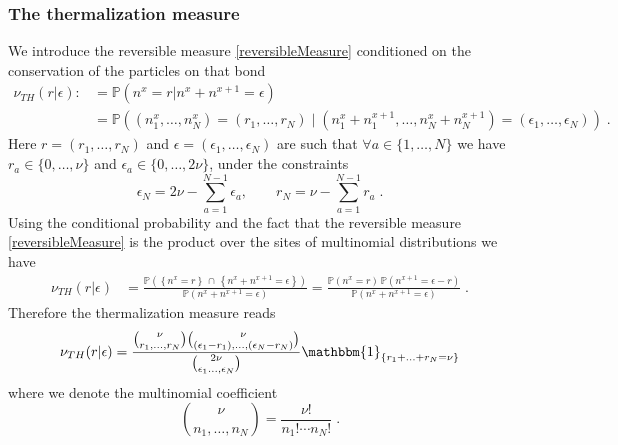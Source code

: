 \documentclass[10pt]{article}
\numberwithin{equation}{section}
\numberwithin{equation}{subsection}
\newcommand{\dt}{\;.}
\begin{document}
\subsubsection{The thermalization measure}
We introduce the reversible measure \eqref{reversibleMeasure} conditioned on the conservation of the particles on that bond
\begin{align}
	\nu_{TH}(r|\epsilon):&=\mathbb{P}\left(n^{x}=r|n^{x}+n^{x+1}=\epsilon\right)\nonumber
	\\&
	=\mathbb{P}\left((n_{1}^{x},\ldots,n_{N}^{x})=
	(r_{1},\ldots,r_{N})\;|\;(n_{1}^{x}+n_{1}^{x+1},\ldots,n_{N}^{x}+n_{N}^{x+1})=(\epsilon_{1},\ldots,\epsilon_{N})\right)\dt
\end{align}
Here $r=(r_{1},\ldots,r_{N})$ and  $\epsilon=(\epsilon_{1},\ldots,\epsilon_{N})$ are such that $\forall a\in\{1,\ldots,N\}$ we have $r_{a}\in \{0,\ldots,\nu\}$ and $\epsilon_{a}\in \{0,\ldots,2\nu\}$, under the constraints 
\begin{equation}
	\epsilon_{N}=2\nu-\sum_{a=1}^{N-1}\epsilon_{a},\qquad r_{N}=\nu-\sum_{a=1}^{N-1}r_{a}\dt
\end{equation}
 Using the conditional probability and the fact that the reversible measure \eqref{reversibleMeasure} is the product over the sites of multinomial distributions we have
\begin{equation}
	\begin{split}
\nu_{TH}(r|\epsilon)&=\frac{\mathbb{P}\left(\left\{n^{x}=r\right\}\,\cap\,\left\{n^{x}+n^{x+1}=\epsilon\right\}\right)}{\mathbb{P}\left(n^{x}+n^{x+1}=\epsilon\right)}=\frac{\mathbb{P}\left(n^{x}=r\right)\,\mathbb{P}\left(n^{x+1}=\epsilon-r\right)}{\mathbb{P}\left(n^{x}+n^{x+1}=\epsilon\right)}\dt
	\end{split}
\end{equation}
Therefore the thermalization measure reads
\begin{equation}
	\begin{split}
	\nu_{TH}(r|\epsilon)=\frac{\binom{\nu}{r_{1},\ldots,r_{N}}\binom{\nu}{(\epsilon_{1}-r_{1}),\ldots,(\epsilon_{N}-r_{N})}}{\binom{2\nu}{\epsilon_{1}\ldots,\epsilon_{N}}}\mathbbm{1}_{\{r_{1}+\ldots+r_{N}=\nu\}}
	\end{split}
\end{equation}
where we denote the multinomial coefficient
\begin{equation}
	\binom{\nu}{n_{1},\ldots,n_{N}}=\frac{\nu!}{n_{1}!\cdots n_{N}!}\dt
\end{equation}
\end{document}

